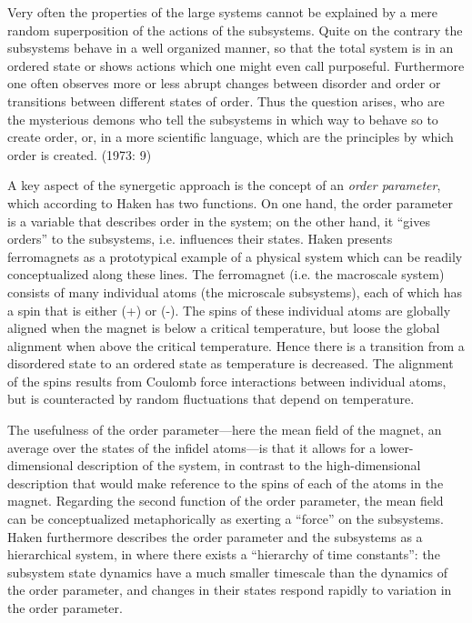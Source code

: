 Very often the properties of the large systems cannot be explained by a mere random superposition of the actions of the subsystems. Quite on the contrary the subsystems behave in a well organized manner, so that the total system is in an ordered state or shows actions which one might even call purposeful. Furthermore one often observes more or less abrupt changes between disorder and order or transitions between different states of order. Thus the question arises, who are the mysterious demons who tell the subsystems in which way to behave so to create order, or, in a more scientific language, which are the principles by which order is created. (1973: 9)

A key aspect of the synergetic approach is the concept of an \textit{order parameter}, which according to Haken has two functions. On one hand, the order parameter is a variable that describes order in the system; on the other hand, it “gives orders” \citep[10]{Haken1973} to the subsystems, i.e. influences their states. Haken presents ferromagnets as a prototypical example of a physical system which can be readily conceptualized along these lines. The ferromagnet (i.e. the macroscale system) consists of many individual atoms (the microscale subsystems), each of which has a spin that is either (+) or (-). The spins of these individual atoms are globally aligned when the magnet is below a critical temperature, but loose the global alignment when above the critical temperature. Hence there is a transition from a disordered state to an ordered state as temperature is decreased. The alignment of the spins results from Coulomb force interactions between individual atoms, but is counteracted by random fluctuations that depend on temperature. 

The usefulness of the order parameter—here the mean field of the magnet, an average over the states of the infidel atoms—is that it allows for a lower-dimensional description of the system, in contrast to the high-dimensional description that would make reference to the spins of each of the atoms in the magnet. Regarding the second function of the order parameter, the mean field can be conceptualized metaphorically as exerting a “force” on the subsystems. Haken furthermore describes the order parameter and the subsystems as a hierarchical system, in where there exists a “hierarchy of time constants”: the subsystem state dynamics have a much smaller timescale than the dynamics of the order parameter, and changes in their states respond rapidly to variation in the order parameter. 

